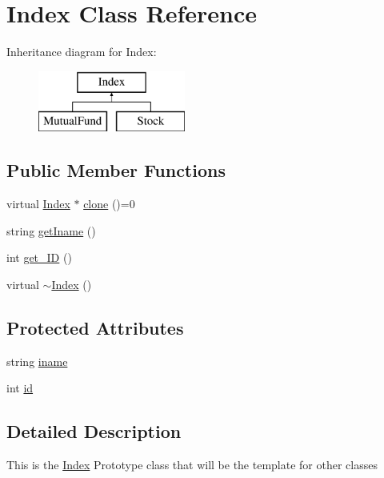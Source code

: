 \hypertarget{class_index}{}\section{Index Class Reference}
\label{class_index}
Inheritance diagram for Index\+:\begin{figure}[H]
\begin{center}
\leavevmode
\includegraphics[height=2.000000cm]{class_index}
\end{center}
\end{figure}
\subsection*{Public Member Functions}
\begin{DoxyCompactItemize}
\item 
virtual \hyperlink{class_index}{Index} $\ast$ \hyperlink{class_index_a124d205cb8e8df365dc1afae159fdfbc}{clone} ()=0
\item 
string \hyperlink{class_index_aad74fe887aeab766171248cf8b413b3c}{get\+Iname} ()
\item 
int \hyperlink{class_index_a993f11e45925419b365ce68271642253}{get\+\_\+\+I\+D} ()
\item 
virtual \hyperlink{class_index_ae0979c13a9609634f0a287a70f243fdd}{$\sim$\+Index} ()
\end{DoxyCompactItemize}
\subsection*{Protected Attributes}
\begin{DoxyCompactItemize}
\item 
string \hyperlink{class_index_ac6ddca43898fcbbfe94ef2c1a4a21265}{iname}
\item 
int \hyperlink{class_index_af83da6af7a90ec91e96c5daad93368c5}{id}
\end{DoxyCompactItemize}


\subsection{Detailed Description}
This is the \hyperlink{class_index}{Index} Prototype class that will be the template for other classes 

